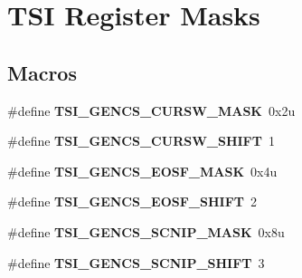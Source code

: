 \hypertarget{group___t_s_i___register___masks}{}\section{T\+S\+I Register Masks}
\label{group___t_s_i___register___masks}
\subsection*{Macros}
\begin{DoxyCompactItemize}
\item 
\hypertarget{group___t_s_i___register___masks_gafd7d98d809a1d17c59cc86addc5fe801}{}\#define {\bfseries T\+S\+I\+\_\+\+G\+E\+N\+C\+S\+\_\+\+C\+U\+R\+S\+W\+\_\+\+M\+A\+S\+K}~0x2u\label{group___t_s_i___register___masks_gafd7d98d809a1d17c59cc86addc5fe801}

\item 
\hypertarget{group___t_s_i___register___masks_gadcd854b12f8b747a492eac3e88522b1e}{}\#define {\bfseries T\+S\+I\+\_\+\+G\+E\+N\+C\+S\+\_\+\+C\+U\+R\+S\+W\+\_\+\+S\+H\+I\+F\+T}~1\label{group___t_s_i___register___masks_gadcd854b12f8b747a492eac3e88522b1e}

\item 
\hypertarget{group___t_s_i___register___masks_ga820de7fe1ecba9a42260e304554b389f}{}\#define {\bfseries T\+S\+I\+\_\+\+G\+E\+N\+C\+S\+\_\+\+E\+O\+S\+F\+\_\+\+M\+A\+S\+K}~0x4u\label{group___t_s_i___register___masks_ga820de7fe1ecba9a42260e304554b389f}

\item 
\hypertarget{group___t_s_i___register___masks_ga9a2e8c68bfb60312ebdeea4f069d9086}{}\#define {\bfseries T\+S\+I\+\_\+\+G\+E\+N\+C\+S\+\_\+\+E\+O\+S\+F\+\_\+\+S\+H\+I\+F\+T}~2\label{group___t_s_i___register___masks_ga9a2e8c68bfb60312ebdeea4f069d9086}

\item 
\hypertarget{group___t_s_i___register___masks_gaf7212a89bc45902f2ed4cee12a1ceb92}{}\#define {\bfseries T\+S\+I\+\_\+\+G\+E\+N\+C\+S\+\_\+\+S\+C\+N\+I\+P\+\_\+\+M\+A\+S\+K}~0x8u\label{group___t_s_i___register___masks_gaf7212a89bc45902f2ed4cee12a1ceb92}

\item 
\hypertarget{group___t_s_i___register___masks_ga372b92d46c9f071d4fdee3edcc0d5219}{}\#define {\bfseries T\+S\+I\+\_\+\+G\+E\+N\+C\+S\+\_\+\+S\+C\+N\+I\+P\+\_\+\+S\+H\+I\+F\+T}~3\label{group___t_s_i___register___masks_ga372b92d46c9f071d4fdee3edcc0d5219}


\end{DoxyCompactItemize}
